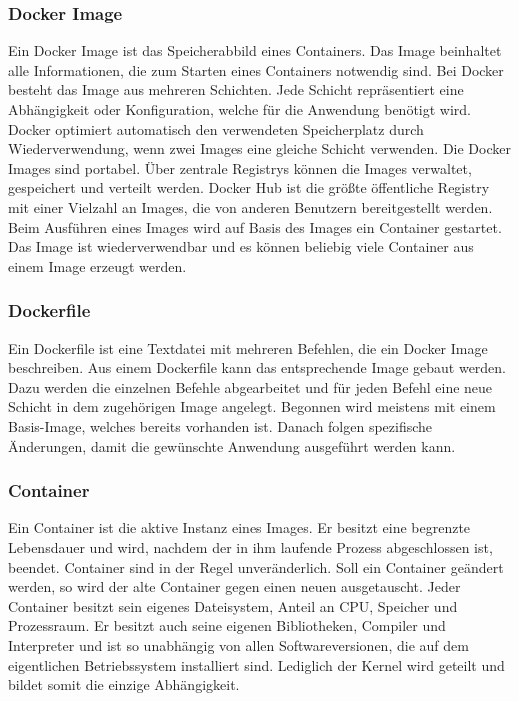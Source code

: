 \subsubsection{Docker Image}

Ein Docker Image ist das Speicherabbild eines Containers. Das Image beinhaltet alle Informationen, die zum Starten eines Containers notwendig sind.  Bei Docker besteht das Image aus mehreren Schichten. Jede Schicht repräsentiert eine Abhängigkeit oder Konfiguration, welche für die Anwendung benötigt wird. Docker optimiert automatisch den verwendeten Speicherplatz durch Wiederverwendung, wenn zwei Images eine gleiche Schicht verwenden. Die Docker Images sind portabel. Über zentrale Registrys können die Images verwaltet, gespeichert und verteilt werden. Docker Hub ist die größte öffentliche Registry mit einer Vielzahl an Images, die von anderen Benutzern bereitgestellt werden. Beim Ausführen eines Images wird auf Basis des Images ein Container gestartet. Das Image ist wiederverwendbar und es können beliebig viele Container aus einem Image erzeugt werden. 

\subsubsection{Dockerfile}

Ein Dockerfile ist eine Textdatei mit mehreren Befehlen, die ein Docker Image beschreiben. Aus einem Dockerfile kann das entsprechende Image gebaut werden. Dazu werden die einzelnen Befehle abgearbeitet und für jeden Befehl eine neue Schicht in dem zugehörigen Image angelegt. Begonnen wird meistens mit einem Basis-Image, welches bereits vorhanden ist. Danach folgen spezifische Änderungen, damit die gewünschte Anwendung ausgeführt werden kann.

\subsubsection{Container}
Ein Container ist die aktive Instanz eines Images. Er besitzt eine begrenzte Lebensdauer und wird, nachdem der in ihm laufende Prozess abgeschlossen ist, beendet. Container sind in der Regel unveränderlich. Soll ein Container geändert werden, so wird der alte Container gegen einen neuen ausgetauscht. Jeder Container besitzt sein eigenes Dateisystem, Anteil an CPU, Speicher und Prozessraum. Er besitzt auch seine eigenen Bibliotheken, Compiler und Interpreter und ist so unabhängig von allen Softwareversionen, die auf dem eigentlichen Betriebssystem installiert sind. Lediglich der Kernel wird geteilt und bildet somit die einzige Abhängigkeit. 

